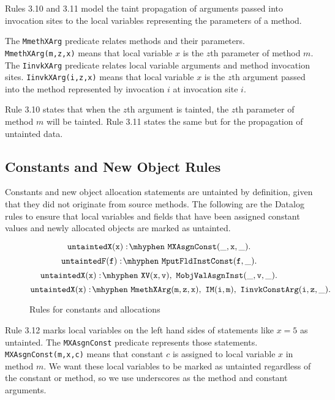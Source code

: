 Rules 3.10 and 3.11 model the taint propagation of arguments passed
into invocation sites to the local variables representing the
parameters of a method.

The \texttt{MmethXArg} predicate relates methods and their
parameters. \\ \texttt{MmethXArg(m,z,x)} means that local variable $x$
is the $z$th parameter of method $m$. The \texttt{IinvkXArg} predicate
relates local variable arguments and method invocation
sites. \texttt{IinvkXArg(i,z,x)} means that local variable $x$ is the
$z$th argument passed into the method represented by invocation $i$ at
invocation site $i$.

Rule 3.10 states that when the $z$th argument is tainted, the $z$th
parameter of method $m$ will be tainted. Rule 3.11 states the same but
for the propagation of untainted data.
\subsection{Constants and New Object Rules}
Constants and new object allocation statements are untainted by
definition, given that they did not originate from source methods. The
following are the Datalog rules to ensure that local variables and
fields that have been assigned constant values and newly allocated
objects are marked as untainted.
\begin{figure}[H]
\begin{equation}
  \mathtt{untaintedX(x) \is MXAsgnConst(\_,x,\_).}
\end{equation}
\begin{equation}
  \mathtt{untaintedF(f) \is MputFldInstConst(f,\_).}
\end{equation}
\begin{equation}
  \mathtt{untaintedX(x) \is XV(x,v) \also MobjValAsgnInst(\_,v,\_).}
\end{equation}
\begin{equation}
  \mathtt{untaintedX(x) \is MmethXArg(m,z,x) \also IM(i,m) \also
    IinvkConstArg(i,z,\_).}
\end{equation}
\caption{Rules for constants and allocations}\label{fig:const}
\end{figure}

Rule 3.12 marks local variables on the left hand sides of statements
like $x = 5$ as untainted. The \texttt{MXAsgnConst} predicate
represents those statements. \texttt{MXAsgnConst(m,x,c)} means that
constant $c$ is assigned to local variable $x$ in method $m$. We want
these local variables to be marked as untainted regardless of the
constant or method, so we use underscores as the method and constant
arguments.

